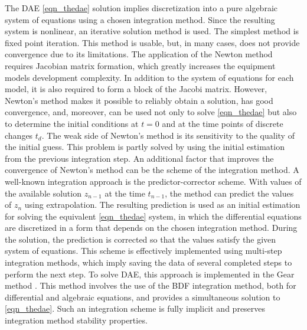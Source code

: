 \documentclass[lettersize,journal]{IEEEtran}
\begin{document}
The DAE \eqref{eqn_thedae} solution implies discretization into a pure algebraic system of equations using a chosen integration method. Since the resulting system is nonlinear, an iterative solution method is used. The simplest method is fixed point iteration. This method is usable, but, in many cases, does not provide convergence due to its limitations. The application of the Newton method requires Jacobian matrix formation, which greatly increases the equipment models development complexity. In addition to the system of equations for each model, it is also required to form a block of the Jacobi matrix. However, Newton's method makes it possible to reliably obtain a solution, has good convergence, and, moreover, can be used not only to solve \eqref{eqn_thedae} but also to determine the initial conditions at \(t=0\) and at the time points of discrete changes \(t_d\). The weak side of Newton's method is its sensitivity to the quality of the initial guess. This problem is partly solved by using the initial estimation from the previous integration step. An additional factor that improves the convergence of Newton's method can be the scheme of the integration method. A well-known integration approach is the predictor-corrector scheme. With values of the available solution \(z_{n-1}\) at the time \(t_{n-1}\), the method can predict the values of \(z_n\) using extrapolation. The resulting prediction is used as an initial estimation for solving the equivalent \eqref{eqn_thedae} system, in which the differential equations are discretized in a form that depends on the chosen integration method. During the solution, the prediction is corrected so that the values satisfy the given system of equations. This scheme is effectively implemented using multi-step integration methods, which imply saving the data of several completed steps to perform the next step. To solve DAE, this approach is implemented in the Gear method \cite{gear71}. This method involves the use of the BDF integration method, both for differential and algebraic equations, and provides a simultaneous solution to \eqref{eqn_thedae}. Such an integration scheme is fully implicit and preserves integration method stability properties.
\end{document}
